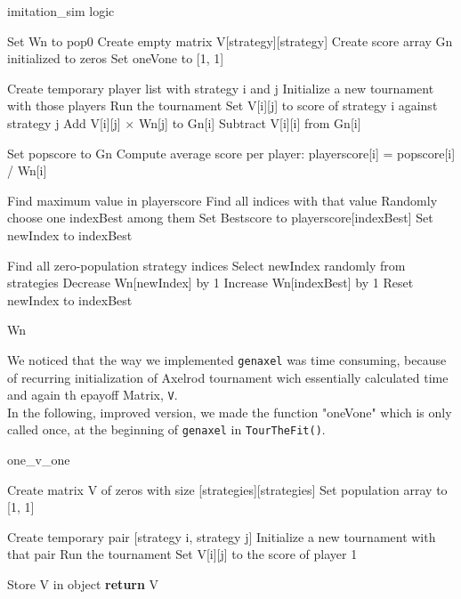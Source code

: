 \documentclass[12pt]{report}
\begin{document}
\begin{algorithm}
\caption{imitation\_sim logic}
\begin{algorithmic}[1]


\State Set Wn to pop0  
\State Create empty matrix V[strategy][strategy]  
\State Create score array Gn initialized to zeros  
\State Set oneVone to [1, 1]

        \State Create temporary player list with strategy i and j  
        \State Initialize a new tournament with those players  
        \State Run the tournament  
        \State Set V[i][j] to score of strategy i against strategy j  
        \State Add V[i][j] $\times$ Wn[j] to Gn[i]  
    \EndFor
    \State Subtract V[i][i] from Gn[i]  
\EndFor

\State Set popscore to Gn  
\State Compute average score per player: playerscore[i] = popscore[i] / Wn[i]  

\State Find maximum value in playerscore  
\State Find all indices with that value  
\State Randomly choose one indexBest among them  
\State Set Bestscore to playerscore[indexBest]  
\State Set newIndex to indexBest

    \State Find all zero-population strategy indices  
            \State Select newIndex randomly from strategies  
        \EndWhile
        \State Decrease Wn[newIndex] by 1  
        \State Increase Wn[indexBest] by 1  
        \State Reset newIndex to indexBest  
    \EndIf
\EndFor

\Return Wn

\EndFunction
\end{algorithmic}
\end{algorithm}
We noticed that the way we implemented \texttt{genaxel} was time consuming, because of recurring initialization of Axelrod tournament wich essentially calculated time and again th epayoff Matrix, \texttt{V}.\\
In the following, improved version, we made the function "oneVone" which is only called once, at the beginning of \texttt{genaxel} in \texttt{TourTheFit()}.
\newpage
\begin{algorithm}
\caption{one\_v\_one}
\begin{algorithmic}[1]


\State Create matrix V of zeros with size [strategies][strategies]  
\State Set population array to [1, 1]

        \State Create temporary pair [strategy i, strategy j]  
        \State Initialize a new tournament with that pair  
        \State Run the tournament  
        \State Set V[i][j] to the score of player 1  
    \EndFor
\EndFor

\State Store V in object  
\State \textbf{return} V
\EndFunction
\end{algorithmic}
\end{algorithm}
\end{document}
